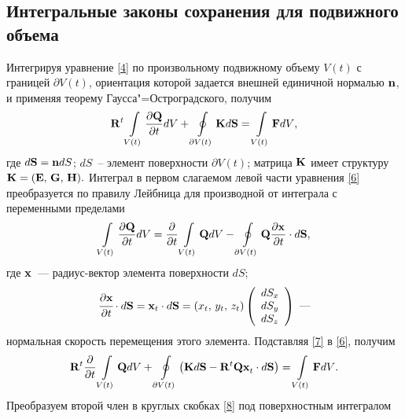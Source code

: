 \subsection{Интегральные законы сохранения для подвижного объема}
\label{s:112}
Интегрируя уравнение \eqref{4} по произвольному подвижному объему $V(t)$  с границей $\partial V(t)$,
ориентация которой задается внешней единичной нормалью ${\bf{n}}$, и применяя теорему 
Гаусса"=Остроградского, получим
\begin{equation}
  \label{6} 
  {\bf{R}}^t \int\limits_{V(t)}
  {\frac{{\partial {\bf{Q}}}}{{\partial t}}dV}  +
  \displaystyle\oint\limits_{\partial V(t)} {\bf{K}} d{\bf{S}} =
  \int\limits_{V(t)} {{\bf{F}}dV},
\end{equation}
где $ d{\bf{S}} = {\bf{n}}dS$;  $dS$~-- элемент поверхности $\partial V (t )$; матрица ${\bf{K}}$ имеет 
структуру ${\bf{K}} = ( {{\bf{E}},\, {\bf{G}},\, {\bf{H}}} ).$ Интеграл в первом слагаемом левой части 
уравнения \eqref{6} преобразуется по правилу Лейбница для производной от интеграла с переменными 
пределами~\cite{fiht}
\begin{equation}
  \label{7} 
  \int\limits_{V(t)} {\frac{{\partial
  {\bf{Q}}}}{{\partial t}}dV} = \frac{\partial }{{\partial t}}\int\limits_{V(t)} {{\bf{Q}}dV} -
  \displaystyle\oint\limits_{\partial V(t)} {{\bf{Q}}
  {\frac{{\partial {\bf{x}}_{} }}{{\partial t}} \cdot d{\bf{S}}} },
\end{equation}
где ${\bf{x}}$~--- радиус-вектор элемента поверхности $dS$;
\begin{equation*}
  \cfrac{{\partial {\bf{x}}}}{{\partial t}} \cdot d{\bf{S}} = {\bf{x}}_t  \cdot d{\bf{S}} =
  ( {x_t ,\,y_t ,\, z_t })  \left(
  \begin{array}{l}
   dS_x  \\
   dS_y  \\
   dS_z  \\
  \end{array} \right)~\text{---}
\end{equation*}
нормальная скорость перемещения этого элемента. Подставляя \eqref{7} в \eqref{6}, получим
\begin{equation}
  \label{8} 
  {\bf{R}}^t \frac{\partial }{{\partial t}}\int\limits_{V(t)} {{\bf{Q}}dV} +
  \displaystyle\oint\limits_{\partial V(t)} {\left(
  {{\bf{K}}d{\bf{S}} - {\bf{R}}^t {\bf{Qx}}_t  \cdot d{\bf{S}}}
  \right)}  = \int\limits_{V(t)} {{\bf{F}}dV}.
\end{equation}
Преобразуем второй член в круглых скобках \eqref{8} под поверхностным интегралом
